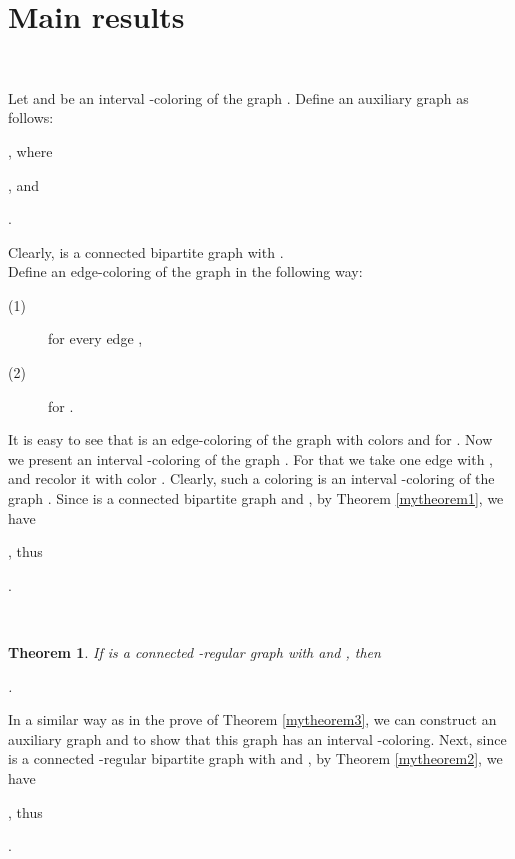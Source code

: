 \documentclass[fleqn,12pt,twoside]{article}
\newtheorem{theorem}{Theorem}
\newenvironment{proof}[1][Proof.]{\begin{trivlist}
\item[\hskip \labelsep {\bfseries #1}]}{\end{trivlist}}
\begin{document}
\bigskip

\section{Main results}\


\begin{proof}[Proof of Theorem \ref{mytheorem3}.] Let  and  be an
interval -coloring of the graph . Define an auxiliary graph
 as follows:
\begin{center}
, where
\end{center}
\begin{center}
, 
and
\end{center}
\begin{center}
.
\end{center}

Clearly,  is a connected bipartite graph with .\\

Define an edge-coloring  of the graph  in the following
way:
\begin{description}
\item[(1)]  for
every edge ,

\item[(2)]  for
.
\end{description}

It is easy to see that  is an edge-coloring of the graph 
with colors  and  for . Now we present an interval
-coloring of the graph . For that we take one edge
 with , and recolor it with color . Clearly, such
a coloring is an interval -coloring of the graph .
Since  is a connected bipartite graph and , by
Theorem \ref{mytheorem1}, we have
\begin{center}
, thus
\end{center}
\begin{center}
.
\end{center}
~
\end{proof}

\begin{theorem}
\label{mytheorem7} If  is a connected -regular graph with
 and , then
\begin{center}
.
\end{center}
\end{theorem}
\begin{proof} In a similar way as in the prove of Theorem
\ref{mytheorem3}, we can construct an auxiliary graph  and to
show that this graph has an interval -coloring. Next,
since  is a connected -regular bipartite graph with  and , by Theorem
\ref{mytheorem2}, we have
\begin{center}
, thus
\end{center}
\begin{center}
.
\end{center}
~
\end{proof}\
\end{document}

